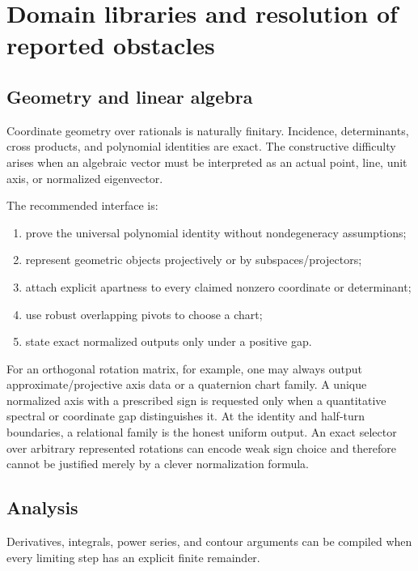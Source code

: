 \section{Domain libraries and resolution of reported obstacles}
\label{sec:domains}

\subsection{Geometry and linear algebra}

Coordinate geometry over rationals is naturally finitary.  Incidence, determinants, cross products, and polynomial identities are exact.  The constructive difficulty arises when an algebraic vector must be interpreted as an actual point, line, unit axis, or normalized eigenvector.

The recommended interface is:
\begin{enumerate}[label=\arabic*.]
\item prove the universal polynomial identity without nondegeneracy assumptions;
\item represent geometric objects projectively or by subspaces/projectors;
\item attach explicit apartness to every claimed nonzero coordinate or determinant;
\item use robust overlapping pivots to choose a chart;
\item state exact normalized outputs only under a positive gap.
\end{enumerate}

For an orthogonal rotation matrix, for example, one may always output approximate/projective axis data or a quaternion chart family.  A unique normalized axis with a prescribed sign is requested only when a quantitative spectral or coordinate gap distinguishes it.  At the identity and half-turn boundaries, a relational family is the honest uniform output.  An exact selector over arbitrary represented rotations can encode weak sign choice and therefore cannot be justified merely by a clever normalization formula.

\subsection{Analysis}

Derivatives, integrals, power series, and contour arguments can be compiled when every limiting step has an explicit finite remainder.

